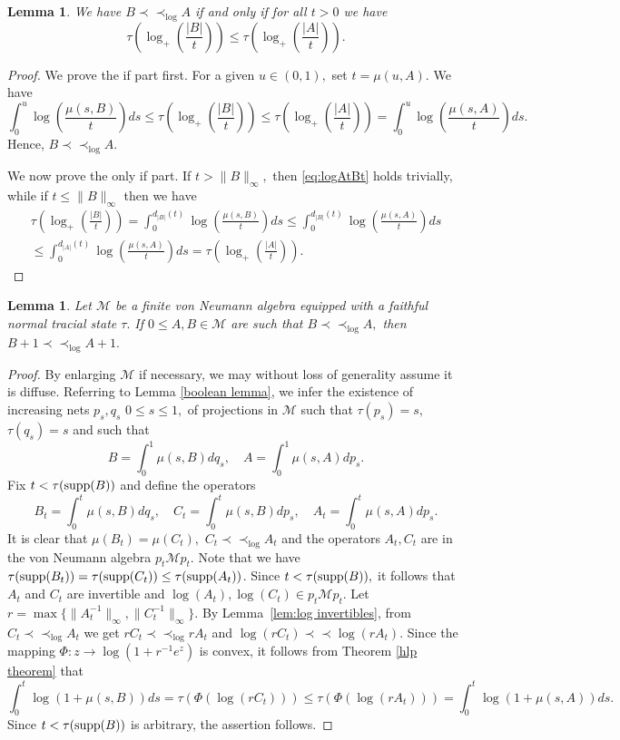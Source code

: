 \documentclass{amsart}
\theoremstyle{plain}
\newtheorem{lem}[thm]{Lemma}
\theoremstyle{remark}
\begin{document}
\begin{lem}\label{logmaj another} We have $B\prec\prec_{\log}A$ if and only if for all $t>0$ we have
\begin{equation}\label{eq:logAtBt}
\tau(\log_+(\frac{|B|}{t}))\leq\tau(\log_+(\frac{|A|}{t})).
\end{equation}
\end{lem}
\begin{proof} We prove the if part first. For a given $u\in(0,1),$ set $t=\mu(u,A).$ We have
$$\int_0^u\log(\frac{\mu(s,B)}{t})ds\leq\tau(\log_+(\frac{|B|}{t}))\leq\tau(\log_+(\frac{|A|}{t}))=\int_0^u\log(\frac{\mu(s,A)}{t})ds.$$
Hence, $B\prec\prec_{\log}A.$

We now prove the only if part. If $t>\|B\|_{\infty},$ then \eqref{eq:logAtBt} holds trivially, while if $t\le\|B\|_{\infty}$ then
we have
\begin{multline*}
\tau(\log_+(\frac{|B|}{t}))=\int_0^{d_{|B|}(t)}\log(\frac{\mu(s,B)}{t})ds\leq\int_0^{d_{|B|}(t)}\log(\frac{\mu(s,A)}{t})ds \\
\leq\int_0^{d_{|A|}(t)}\log(\frac{\mu(s,A)}{t})ds=\tau(\log_+(\frac{|A|}{t})).
\end{multline*}
\end{proof}

\begin{lem}\label{stamp} Let $\mathcal{M}$ be a finite von Neumann algebra equipped with a faithful normal tracial state $\tau.$ If $0\leq A,B\in\mathcal{M}$ are such that $B\prec\prec_{\log}A,$ then $B+1\prec\prec_{\log}A+1.$
\end{lem}
\begin{proof}
By enlarging $\mathcal{M}$ if necessary, we may without loss of generality assume it is diffuse.
Referring to Lemma \ref{boolean lemma}, we infer the existence of increasing nets $p_s,q_s$ $0\leq s\leq1,$ of projections in $\mathcal{M}$ such that $\tau(p_s)=s,$ $\tau(q_s)=s$ and such that
$$B=\int_0^1\mu(s,B)dq_s,\quad A=\int_0^1\mu(s,A)dp_s.$$
Fix $t<\tau({\rm supp}(B))$ and define the operators
$$B_t=\int_0^t\mu(s,B)dq_s,\quad C_t=\int_0^t\mu(s,B)dp_s,\quad A_t=\int_0^t\mu(s,A)dp_s.$$
It is clear that $\mu(B_t)=\mu(C_t),$ $C_t\prec\prec_{\log} A_t$ and the operators $A_t,C_t$ are in the von Neumann algebra $p_t\mathcal{M}p_t$.
Note that we have $\tau({\rm supp}(B_t))=\tau({\rm supp}(C_t))\le\tau({\rm supp}(A_t))$.
Since $t<\tau({\rm supp}(B)),$ it follows that $A_t$ and $C_t$ are invertible
and $\log(A_t),\log(C_t)\in p_t\mathcal{M}p_t$.
Let $r=\max\{\|A_t^{-1}\|_{\infty},\|C_t^{-1}\|_{\infty}\}$.
By Lemma~\ref{lem:log invertibles}, from $C_t\prec\prec_{\log}A_t$ we get
$rC_t\prec\prec_{\log}rA_t$ and $\log(r C_t)\prec\prec\log(rA_t)$.
Since the mapping $\Phi:z\to\log(1+r^{-1}e^z)$ is convex, it follows from Theorem \ref{hlp theorem} that
\[
\int_0^t\log(1+\mu(s,B))ds=\tau(\Phi(\log(rC_t)))\leq\tau(\Phi(\log(rA_t)))=\int_0^t\log(1+\mu(s,A))ds.
\]
Since $t<\tau({\rm supp}(B))$ is arbitrary, the assertion follows.
\end{proof}
\end{document}
